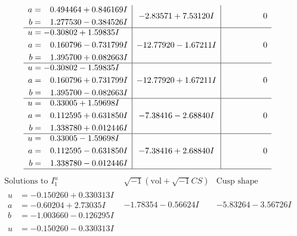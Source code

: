 \documentclass[1p]{elsarticle_modified}
\theoremstyle{definition}
\newcommand{\I}{\sqrt{-1}}
\begin{document}
$$\begin{array}{c|c|c}
\begin{aligned}
a &= \phantom{-}0.494464 + 0.846169 I \\
b &= \phantom{-}1.277530 - 0.384526 I\end{aligned}
 & -2.83571 + 7.53120 I & \phantom{-0.000000 } 0 \\ \hline\begin{aligned}
u &= -0.30802 + 1.59835 I \\
a &= \phantom{-}0.160796 - 0.731799 I \\
b &= \phantom{-}1.395700 + 0.082663 I\end{aligned}
 & -12.77920 - 1.67211 I & \phantom{-0.000000 } 0 \\ \hline\begin{aligned}
u &= -0.30802 - 1.59835 I \\
a &= \phantom{-}0.160796 + 0.731799 I \\
b &= \phantom{-}1.395700 - 0.082663 I\end{aligned}
 & -12.77920 + 1.67211 I & \phantom{-0.000000 } 0 \\ \hline\begin{aligned}
u &= \phantom{-}0.33005 + 1.59698 I \\
a &= \phantom{-}0.112595 + 0.631850 I \\
b &= \phantom{-}1.338780 + 0.012446 I\end{aligned}
 & -7.38416 - 2.68840 I & \phantom{-0.000000 } 0 \\ \hline\begin{aligned}
u &= \phantom{-}0.33005 - 1.59698 I \\
a &= \phantom{-}0.112595 - 0.631850 I \\
b &= \phantom{-}1.338780 - 0.012446 I\end{aligned}
 & -7.38416 + 2.68840 I & \phantom{-0.000000 } 0\\
 \hline 
 \end{array}$$\newpage$$\begin{array}{c|c|c}  
\text{Solutions to }I^u_{1}& \I (\text{vol} + \sqrt{-1}CS) & \text{Cusp shape}\\
 \hline 
\begin{aligned}
u &= -0.150260 + 0.330313 I \\
a &= -0.60204 + 2.73035 I \\
b &= -1.003660 - 0.126295 I\end{aligned}
 & -1.78354 - 0.56624 I & -5.83264 - 3.56726 I \\ \hline\begin{aligned}
u &= -0.150260 - 0.330313 I \\

\end{aligned}
\end{array}$$
\end{document}
